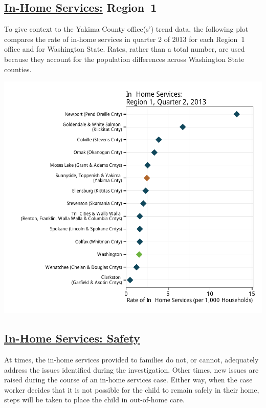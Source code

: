 \documentclass{article}\usepackage[]{graphicx}\usepackage[]{color}
\makeatletter
\def\maxwidth{ %
  \ifdim\Gin@nat@width>\linewidth
    \linewidth
  \else
    \Gin@nat@width
  \fi
}
\newenvironment{knitrout}{}{} %
\makeatother
\begin{document}
\subsection{\href{http://www.partnersforourchildren.org/child-well-being/visualizations/home-services/trends}
    {In-Home Services:} Region~1
}
To give context to the Yakima County office(s') trend data, the following plot compares the rate of in-home services in quarter 2 of 2013 for each Region~1 office and for Washington State. Rates, rather than a total number, are used because they account for the population differences across Washington State counties.
\nopagebreak[3]
\begin{knitrout}
\color{fgcolor}

{\centering \includegraphics[width=\maxwidth]{figure/ihs_context} 

}



\end{knitrout}


\newpage

\subsection{\href{http://www.partnersforourchildren.org/child-well-being/visualizations/home-services/safety}
    {In-Home Services: Safety}
}
At times, the in-home services provided to families do not, or cannot, adequately address the issues identified during the investigation. Other times, new issues are raised during the course of an in-home services case. Either way, when the case worker decides that it is not possible for the child to remain safely in their home, steps will be taken to place the child in out-of-home care.
\end{document}
